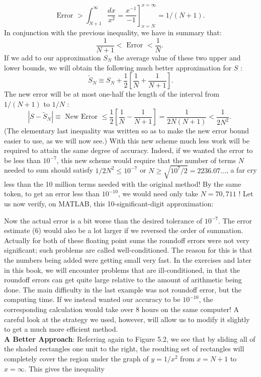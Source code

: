 \documentclass[../main.tex]{subfiles}
\begin{document}
$$
\text { Error } \left.>\int_{N+1}^{\infty} \frac{d x}{x^{2}}=\frac{x^{-1}}{-1}\right]_{x=N}^{x=\infty}=1 /(N+1) \text {. }
$$
In conjunction with the previous inequality, we have in summary that:
$$
\frac{1}{N+1}<\text { Error }<\frac{1}{N} \text {. }
$$
If we add to our approximation $S_{N}$ the average value of these two upper and lower bounds, we will obtain the following much better approximation for $S$ :
$$
\tilde{S}_{N} \equiv S_{N}+\frac{1}{2}\left[\frac{1}{N}+\frac{1}{N+1}\right] .
$$
The new error will be at most one-half the length of the interval from $1 /(N+1)$ to $1 / N$ :
$$
\left|S-\tilde{S}_{N}\right| \equiv \text { New Error } \leq \frac{1}{2}\left[\frac{1}{N}-\frac{1}{N+1}\right]=\frac{1}{2 N(N+1)}<\frac{1}{2 N^{2}} \text {. }
$$
(The elementary last inequality was written so as to make the new error bound easier to use, as we will now see.) With this new scheme much less work will be required to attain the same degree of accuracy. Indeed, if we wanted the error to be less than $10^{-7}$, this new scheme would require that the number of terms $N$ needed to sum should satisfy $1 / 2 N^{2} \leq 10^{-7}$ or $N \geq \sqrt{10^{7} / 2}=2236.07 \ldots$, a far cry less than the 10 million terms needed with the original method! By the same token, to get an error less than $10^{-10}$, we would need only take $N=70,711$ ! Let us now verify, on MATLAB, this 10-significant-digit approximation:

Now the actual error is a bit worse than the desired tolerance of $10^{-7}$. The error estimate (6) would also be a lot larger if we reversed the order of summation. Actually for both of these floating point sums the roundoff errors were not very significant; such problems are called well-conditioned. The reason for this is that the numbers being added were getting small very fast. In the exercises and later in this book, we will encounter problems that are ill-conditioned, in that the roundoff errors can get quite large relative to the amount of arithmetic being done. The main difficulty in the last example was not roundoff error, but the computing time. If we instead wanted our accuracy to be $10^{-10}$, the corresponding calculation would take over 8 hours on the same computer! A careful look at the strategy we used, however, will allow us to modify it slightly to get a much more efficient method.\\

\textbf{A Better Approach}: Referring again to Figure 5.2, we see that by sliding all of the shaded rectangles one unit to the right, the resulting set of rectangles will completely cover the region under the graph of $y=1 / x^{2}$ from $x=N+1$ to $x=\infty$. This gives the inequality
\end{document}
